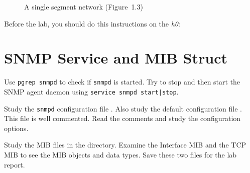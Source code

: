 \documentclass{../UTNetLab}
\begin{document}
\begin{center}
\begin{minipage}{0.48\textwidth}
\begin{flushright}
\begin{figure}[H]
                    \caption{A single segment network (Figure~1.3)}\label{fig:1.3}
                \end{figure}
            \end{flushright}
        \end{minipage}
    \end{center}

    Before the lab, you should do this instructions on the \textit{h0}:

\section{SNMP Service and MIB Struct}
    Use \lstinline{pgrep snmpd} to check if \lstinline{snmpd} is started.
    Try to stop and then start the SNMP agent daemon using \lstinline{service snmpd start|stop}.

    Study the \lstinline{snmpd} configuration file .
    Also study the default configuration file .
    This file is well commented.
    Read the comments and study the configuration options.

    Study the MIB files in the  directory.
    Examine the Interface MIB  and the TCP MIB  to see the MIB objects and data types.
    Save these two files for the lab report.
\end{document}
